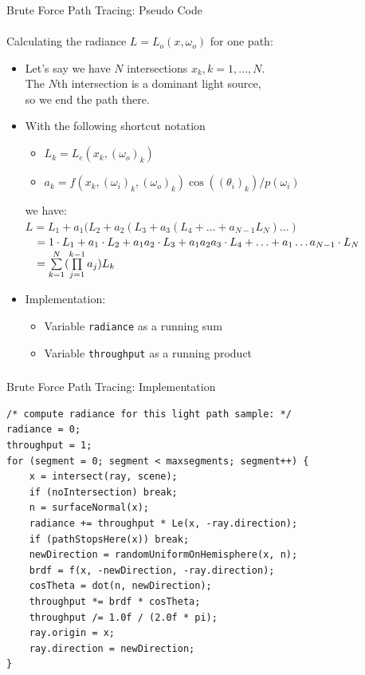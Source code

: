 \documentclass[utf8,stillsansserifmath,fleqn,t]{beamer}
\newcommand{\code}[1]{\texttt{#1}}
\begin{document}
\begin{frame}[label=path-tracing-brute-force-path]
\frametitle{\insertsection}
Brute Force Path Tracing: Pseudo Code\\~\\
Calculating the radiance $L = L_o(x, \omega_o)$ for one path:
\begin{itemize}
\item Let's say we have $N$ intersections $x_k, k=1,\ldots, N$.\\
    The $N$th intersection is a dominant light source,\\ %
    so we end the path there.
\item With the following shortcut notation
    \begin{itemize}
    \item $L_k = L_e(x_k, (\omega_o)_k)$
    \item $a_k = f(x_k, (\omega_i)_k, (\omega_o)_k) \cos((\theta_i)_k) / p(\omega_i)$
    \end{itemize}
    we have:\\
    $L = L_1 + a_1(L_2 + a_2(L_3 + a_3(L_4 + \ldots + a_{N-1}L_N)\ldots)$
    $\hphantom{L} = 1\cdot L_1 + a_1\cdot L_2 + a_1a_2\cdot L_3 + a_1a_2a_3\cdot L_4 + \ldots + a_1\ldots a_{N-1}\cdot L_N$
    $\hphantom{L} = \sum\limits_{k=1}^N (\prod\limits_{j=1}^{k-1} a_j)L_k$
\item Implementation:
    \begin{itemize}
    \item Variable \code{radiance} as a running sum
    \item Variable \code{throughput} as a running product
    \end{itemize}
\end{itemize}
\end{frame}

\begin{frame}[fragile]
\frametitle{\insertsection}
Brute Force Path Tracing: Implementation\\
\begin{lstlisting}
/* compute radiance for this light path sample: */
radiance = 0;
throughput = 1;
for (segment = 0; segment < maxsegments; segment++) {
    x = intersect(ray, scene);
    if (noIntersection) break;
    n = surfaceNormal(x);
    radiance += throughput * Le(x, -ray.direction);
    if (pathStopsHere(x)) break;
    newDirection = randomUniformOnHemisphere(x, n);
    brdf = f(x, -newDirection, -ray.direction);
    cosTheta = dot(n, newDirection);
    throughput *= brdf * cosTheta;
    throughput /= 1.0f / (2.0f * pi);
    ray.origin = x;
    ray.direction = newDirection;
}
\end{lstlisting}
\end{frame}
\end{document}
